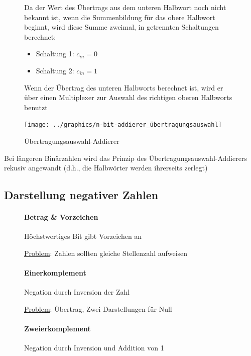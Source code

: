 \documentclass[12pt]{report}
\begin{document}
\begin{figure}[H]
  \begin{minipage}[t]{.45\textwidth}
    Da der Wert des Übertrags aus dem unteren Halbwort noch nicht bekannt ist, wenn die Summenbildung für das obere
    Halbwort beginnt, wird diese Summe zweimal, in getrennten Schaltungen berechnet:
    \begin{itemize}
      \item Schaltung 1: $c_{in} = 0$
      \item Schaltung 2: $c_{in} = 1$
    \end{itemize}
    \par Wenn der Übertrag des unteren Halbworts berechnet ist, wird er über einen 
    Multiplexer zur Auswahl des richtigen oberen Halbworts benutzt
  \end{minipage}
  \hfill
  \begin{minipage}[t]{.45\textwidth}
    \caption{Übertragungsauswahl-Addierer}
    \centering
    \texttt{[image: ../graphics/n-bit-addierer\_übertragungsauswahl]}
  \end{minipage}
\end{figure}

\begin{infobox}
  Bei längeren Binärzahlen wird das Prinzip des Übertragungsauswahl-Addierers rekusiv angewandt (d.h., die Halbwörter werden ihrerseits zerlegt)
\end{infobox}

\subsection{Darstellung negativer Zahlen}
\begin{figure}[H]
  \begin{minipage}[t]{.3\textwidth}
    \centering
    \paragraph{Betrag \& Vorzeichen}
    \small Höchstwertiges Bit gibt Vorzeichen an
    
    \underline{Problem}: Zahlen sollten gleiche Stellenzahl aufweisen
  \end{minipage}
  \hfill
  \begin{minipage}[t]{.3\textwidth}
    \centering
    \paragraph{Einerkomplement}
    \small Negation durch Inversion der Zahl
    
    \underline{Problem}: Übertrag, Zwei Darstellungen für Null
  \end{minipage}
  \hfill
  \begin{minipage}[t]{.3\textwidth}
    \centering
    \paragraph{Zweierkomplement}
    \small Negation durch Inversion und Addition von 1
  \end{minipage}
\end{figure}
\end{document}
